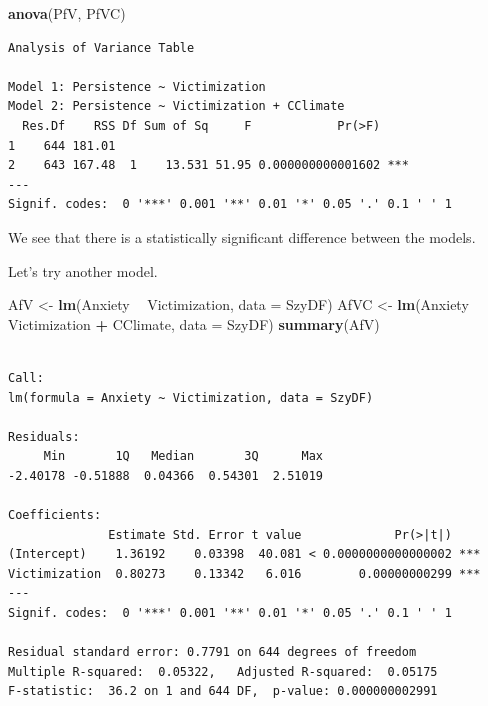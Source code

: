 \documentclass[
  english,
]{book}
\newenvironment{Shaded}{\begin{snugshade}}{\end{snugshade}}
\newcommand{\DataTypeTok}[1]{\textcolor[rgb]{0.13,0.29,0.53}{#1}}
\newcommand{\KeywordTok}[1]{\textcolor[rgb]{0.13,0.29,0.53}{\textbf{#1}}}
\newcommand{\NormalTok}[1]{#1}
\newcommand{\OperatorTok}[1]{\textcolor[rgb]{0.81,0.36,0.00}{\textbf{#1}}}
\newcommand{\StringTok}[1]{\textcolor[rgb]{0.31,0.60,0.02}{#1}}
\begin{document}
\begin{Shaded}
\begin{Highlighting}[]
\KeywordTok{anova}\NormalTok{(PfV, PfVC)}
\end{Highlighting}
\end{Shaded}

\begin{verbatim}
Analysis of Variance Table

Model 1: Persistence ~ Victimization
Model 2: Persistence ~ Victimization + CClimate
  Res.Df    RSS Df Sum of Sq     F            Pr(>F)    
1    644 181.01                                         
2    643 167.48  1    13.531 51.95 0.000000000001602 ***
---
Signif. codes:  0 '***' 0.001 '**' 0.01 '*' 0.05 '.' 0.1 ' ' 1
\end{verbatim}

We see that there is a statistically significant difference between the models.

Let's try another model.

\begin{Shaded}
\begin{Highlighting}[]
\NormalTok{AfV <-}\StringTok{ }\KeywordTok{lm}\NormalTok{(Anxiety }\OperatorTok{~}\StringTok{ }\NormalTok{Victimization, }\DataTypeTok{data =}\NormalTok{ SzyDF)}
\NormalTok{AfVC <-}\StringTok{ }\KeywordTok{lm}\NormalTok{(Anxiety }\OperatorTok{~}\StringTok{ }\NormalTok{Victimization }\OperatorTok{+}\StringTok{ }\NormalTok{CClimate, }\DataTypeTok{data =}\NormalTok{ SzyDF)}
\KeywordTok{summary}\NormalTok{(AfV)}
\end{Highlighting}
\end{Shaded}

\begin{verbatim}

Call:
lm(formula = Anxiety ~ Victimization, data = SzyDF)

Residuals:
     Min       1Q   Median       3Q      Max 
-2.40178 -0.51888  0.04366  0.54301  2.51019 

Coefficients:
              Estimate Std. Error t value             Pr(>|t|)    
(Intercept)    1.36192    0.03398  40.081 < 0.0000000000000002 ***
Victimization  0.80273    0.13342   6.016        0.00000000299 ***
---
Signif. codes:  0 '***' 0.001 '**' 0.01 '*' 0.05 '.' 0.1 ' ' 1

Residual standard error: 0.7791 on 644 degrees of freedom
Multiple R-squared:  0.05322,   Adjusted R-squared:  0.05175 
F-statistic:  36.2 on 1 and 644 DF,  p-value: 0.000000002991
\end{verbatim}
\end{document}
